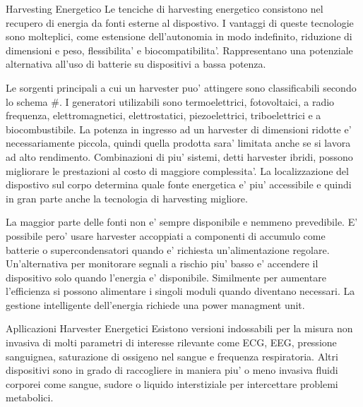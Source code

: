 \begin{multicols}{2}
\begin{section}{Harvesting Energetico}
    Le tenciche di harvesting energetico consistono nel recupero di energia da fonti esterne al dispostivo. I vantaggi di queste tecnologie sono molteplici, come estensione dell'autonomia in modo indefinito, riduzione di dimensioni e peso, flessibilita' e biocompatibilita'. Rappresentano una potenziale alternativa all'uso di batterie su dispositivi a bassa potenza.

    Le sorgenti principali a cui un harvester puo' attingere sono classificabili secondo lo schema \#. I generatori utilizabili sono termoelettrici, fotovoltaici, a radio frequenza, elettromagnetici, elettrostatici, piezoelettrici, triboelettrici e a biocombustibile. La potenza in ingresso ad un harvester di dimensioni ridotte e' necessariamente piccola, quindi quella prodotta sara' limitata anche se si lavora ad alto rendimento. Combinazioni di piu' sistemi, detti harvester ibridi, possono migliorare le prestazioni al costo di maggiore complessita'. La localizzazione del dispostivo sul corpo determina quale fonte energetica e' piu' accessibile e quindi in gran parte anche la tecnologia di harvesting migliore. 
    
    La maggior parte delle fonti non e' sempre disponibile e nemmeno prevedibile. E' possibile pero' usare harvester accoppiati a componenti di accumulo come batterie o supercondensatori quando e' richiesta un'alimentazione regolare. Un'alternativa per monitorare segnali a rischio piu' basso e' accendere il dispositivo solo quando l'energia e' disponibile. Similmente per aumentare l'efficienza si possono alimentare i singoli moduli quando diventano necessari. La gestione intelligente dell'energia richiede una power managment unit.
\end{section}

\begin{section}{Apllicazioni Harvester Energetici}
    Esistono versioni indossabili per la misura non invasiva di molti parametri di interesse rilevante come ECG, EEG, pressione sanguignea, saturazione di ossigeno nel sangue e frequenza respiratoria. Altri dispositivi sono in grado di raccogliere in maniera piu' o meno invasiva fluidi corporei come sangue, sudore o liquido interstiziale per intercettare problemi metabolici. 
    

\end{section}
\end{multicols}
